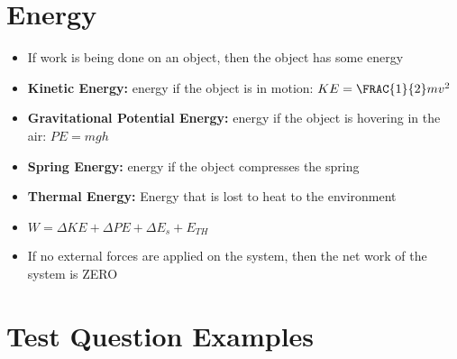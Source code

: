 \section{Energy}

\begin{itemize}
    \item If work is being done on an object, then the object has some energy
    \item \textbf{Kinetic Energy:} energy if the object is in motion: $KE = \FRAC{1}{2}mv^2$
    \item \textbf{Gravitational Potential Energy:} energy if the object is hovering in the air: $PE = mgh$
    \item \textbf{Spring Energy:} energy if the object compresses the spring
    \item \textbf{Thermal Energy:} Energy that is lost to heat to the environment
    \item $W = \Delta KE + \Delta PE + \Delta E_s + E_{TH}$
    \item If no external forces are applied on the system, then the net work of the system is ZERO
\end{itemize}

\section{Test Question Examples}

